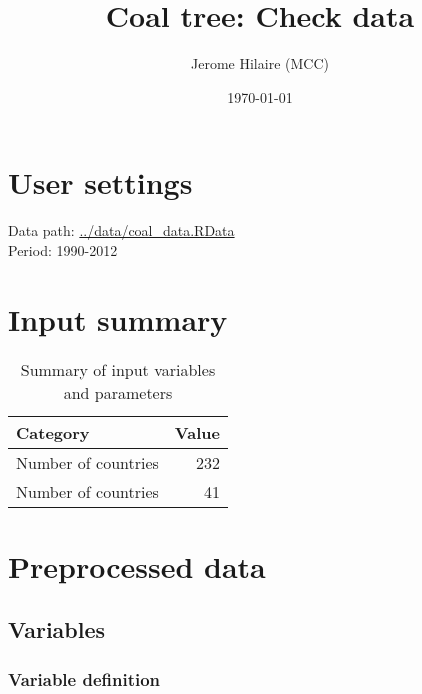 \documentclass{article}\usepackage[]{graphicx}\usepackage[]{color}
\title{Coal tree: Check data}
\author{Jerome Hilaire (MCC)}
\date{\today}
\begin{document}
\maketitle
\tableofcontents
\clearpage



\section{User settings}

Data path: \url{../data/coal_data.RData} \\
Period: 1990-2012

\section{Input summary}


\begin{longtable}[t]{l|r}
\caption{\label{tab:input_summary}Summary of input variables and parameters}\\
\hline
Category & Value\\
\hline
Number of countries & 232\\
\hline
Number of countries & 41\\
\hline
\end{longtable}




\section{Preprocessed data}
\subsection{Variables}

\subsubsection{Variable definition}
\end{document}
